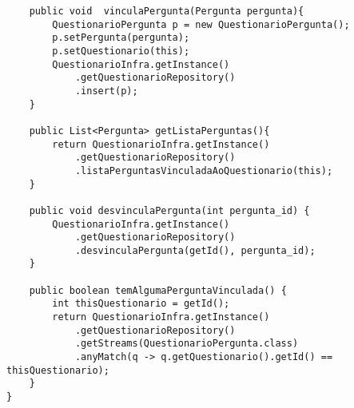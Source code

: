 \begin{lstlisting}
	public void  vinculaPergunta(Pergunta pergunta){
		QuestionarioPergunta p = new QuestionarioPergunta();
		p.setPergunta(pergunta);
		p.setQuestionario(this);
		QuestionarioInfra.getInstance()
			.getQuestionarioRepository()
			.insert(p);
	}

	public List<Pergunta> getListaPerguntas(){
		return QuestionarioInfra.getInstance()
			.getQuestionarioRepository()
			.listaPerguntasVinculadaAoQuestionario(this);
	}

	public void desvinculaPergunta(int pergunta_id) {
		QuestionarioInfra.getInstance()
			.getQuestionarioRepository()
			.desvinculaPergunta(getId(), pergunta_id);
	}

	public boolean temAlgumaPerguntaVinculada() {
		int thisQuestionario = getId();
		return QuestionarioInfra.getInstance()
			.getQuestionarioRepository()
			.getStreams(QuestionarioPergunta.class)
			.anyMatch(q -> q.getQuestionario().getId() == thisQuestionario);
	}
}

\end{lstlisting}